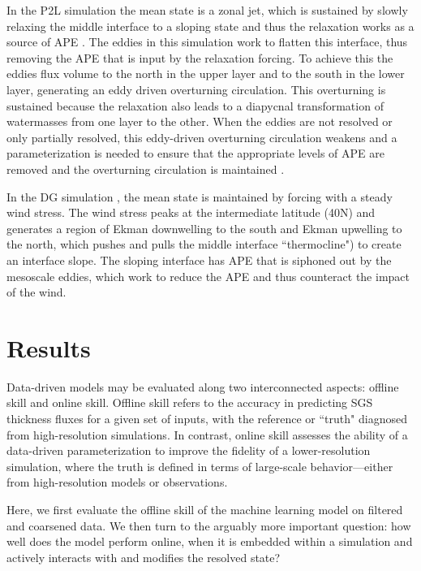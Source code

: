\documentclass[draft]{agujournal2019}
\begin{document}
In the P2L simulation the mean state is a zonal jet, which is sustained by slowly relaxing the middle interface to a sloping state and thus the relaxation works as a source of APE \cite{hallberg2013using}. 
The eddies in this simulation work to flatten this interface, thus removing the APE that is input by the relaxation forcing. To achieve this the eddies flux volume to the north in the upper layer and to the south in the lower layer, generating an eddy driven overturning circulation. This overturning is sustained because the relaxation also leads to a diapycnal transformation of watermasses from one layer to the other. 
When the eddies are not resolved or only partially resolved, this eddy-driven overturning circulation weakens and a parameterization is needed to ensure that the appropriate levels of APE are removed and the overturning circulation is maintained \cite{hallberg2013using}. %

In the DG simulation \cite{zhang2023implementation}, the mean state is maintained by forcing with a steady wind stress. The wind stress peaks at the intermediate latitude (40N) and generates a region of Ekman downwelling to the south and Ekman upwelling to the north, which pushes and pulls the middle interface ``thermocline") to create an interface slope. The sloping interface has APE that is siphoned out by the mesoscale eddies, which work to reduce the APE and thus counteract the impact of the wind. %


\section{Results}
Data-driven models may be evaluated along two interconnected aspects: offline skill and online skill. Offline skill refers to the accuracy in predicting SGS thickness fluxes for a given set of inputs, with the reference or ``truth" diagnosed from high-resolution simulations. In contrast, online skill assesses the ability of a data-driven parameterization to improve the fidelity of a lower-resolution simulation, where the truth is defined in terms of large-scale behavior—either from high-resolution models or observations.

Here, we first evaluate the offline skill of the machine learning model on filtered and coarsened data. We then turn to the arguably more important question: how well does the model perform online, when it is embedded within a simulation and actively interacts with and modifies the resolved state?
\end{document}
